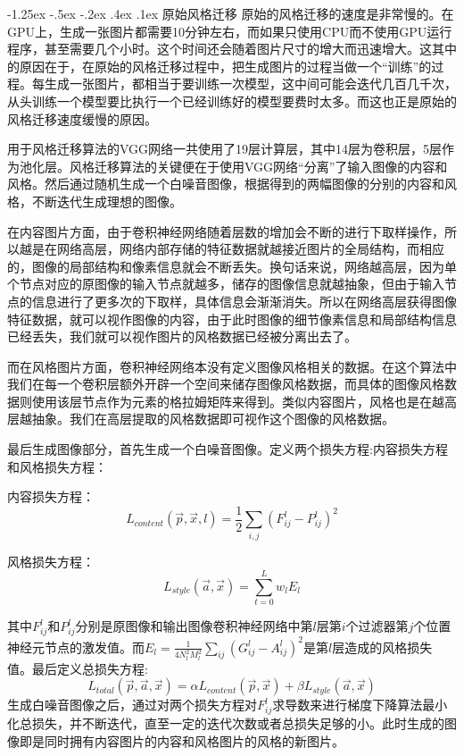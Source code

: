 \documentclass[a4paper, 11pt]{article}
\makeatletter
\newcommand{\xiaosihao}{\fontsize{12pt}{\baselineskip}\selectfont}
\renewcommand\subsection{\@startsection{subsection}{1}{\z@}%
{-1.25ex \@plus -.5ex \@minus -.2ex}%
{.4ex \@plus .1ex}%
{\normalfont\xiaosihao\CJKfamily{hei}}}
\makeatother
\begin{document}
\subsection{原始风格迁移}
原始的风格迁移的速度是非常慢的。在GPU上，生成一张图片都需要10分钟左右，而如果只使用CPU而不使用GPU运行程序，甚至需要几个小时。这个时间还会随着图片尺寸的增大而迅速增大。这其中的原因在于，在原始的风格迁移过程中，把生成图片的过程当做一个“训练”的过程。每生成一张图片，都相当于要训练一次模型，这中间可能会迭代几百几千次，从头训练一个模型要比执行一个已经训练好的模型要费时太多。而这也正是原始的风格迁移速度缓慢的原因。

用于风格迁移算法的VGG网络一共使用了19层计算层，其中14层为卷积层，5层作为池化层。风格迁移算法的关键便在于使用VGG网络“分离”了输入图像的内容和风格。然后通过随机生成一个白噪音图像，根据得到的两幅图像的分别的内容和风格，不断迭代生成理想的图像。

在内容图片方面，由于卷积神经网络随着层数的增加会不断的进行下取样操作，所以越是在网络高层，网络内部存储的特征数据就越接近图片的全局结构，而相应的，图像的局部结构和像素信息就会不断丢失。换句话来说，网络越高层，因为单个节点对应的原图像的输入节点就越多，储存的图像信息就越抽象，但由于输入节点的信息进行了更多次的下取样，具体信息会渐渐消失。所以在网络高层获得图像特征数据，就可以视作图像的内容，由于此时图像的细节像素信息和局部结构信息已经丢失，我们就可以视作图片的风格数据已经被分离出去了。

而在风格图片方面，卷积神经网络本没有定义图像风格相关的数据。在这个算法中我们在每一个卷积层额外开辟一个空间来储存图像风格数据，而具体的图像风格数据则使用该层节点作为元素的格拉姆矩阵来得到。类似内容图片，风格也是在越高层越抽象。我们在高层提取的风格数据即可视作这个图像的风格数据\cite{nnmethod}。

最后生成图像部分，首先生成一个白噪音图像。定义两个损失方程:内容损失方程和风格损失方程：

内容损失方程：
\begin{equation}
L_{content}(\vec{p},\vec{x},l)=\frac{1}{2}\sum_{i,j}(F_{ij}^{l}-P_{ij}^{l})^2
\end{equation}

风格损失方程：
\begin{equation}
L_{style}(\vec{a},\vec{x})=\sum_{t=0}^{L}w_lE_l
\end{equation}

其中$F_{ij}^{l}$和$P_{ij}^{l}$分别是原图像和输出图像卷积神经网络中第$l$层第$i$个过滤器第$j$个位置神经元节点的激发值。而$E_l=\frac{1}{4N_l^2M_l^2}\sum_{ij}(G_{ij}^{l}-A_{ij}^{l})^2$是第$l$层造成的风格损失值。最后定义总损失方程:
\begin{equation}
L_{total}(\vec{p},\vec{a},\vec{x})=\alpha L_{content}(\vec{p},\vec{x})+\beta L_{style}(\vec{a},\vec{x})
\end{equation}
生成白噪音图像之后，通过对两个损失方程对$F_{ij}^{l}$求导数来进行梯度下降算法最小化总损失，并不断迭代，直至一定的迭代次数或者总损失足够的小。此时生成的图像即是同时拥有内容图片的内容和风格图片的风格的新图片。
\end{document}
